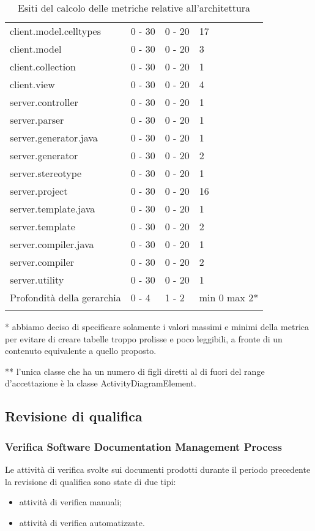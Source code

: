 \begin{longtable}{|p{5.5cm}|p{2.25cm}|p{2.25cm}|p{2.25cm}|}
		client.model.celltypes &0 - 30 &0 - 20 &17\\
		client.model &0 - 30 &0 - 20 &3\\
		client.collection &0 - 30 &0 - 20 &1\\
		client.view &0 - 30 &0 - 20 &4\\
		server.controller &0 - 30 &0 - 20 &1\\
		server.parser &0 - 30 &0 - 20 &1\\
		server.generator.java &0 - 30 &0 - 20 &1\\
		server.generator &0 - 30 &0 - 20 &2\\
		server.stereotype &0 - 30 &0 - 20 &1\\
		server.project &0 - 30 &0 - 20 &16\\
		server.template.java &0 - 30 &0 - 20 &1\\
		server.template &0 - 30 &0 - 20 &2\\
		server.compiler.java &0 - 30 &0 - 20 &1\\
		server.compiler &0 - 30 &0 - 20 &2\\
		server.utility &0 - 30 &0 - 20 &1\\
		\hline
		Profondità della gerarchia &0 - 4 &1 - 2 &min 0 max 2*\\
		\hline
		\caption{Esiti del calcolo delle metriche relative all'architettura}
		\end{longtable}
	* abbiamo deciso di specificare solamente i valori massimi e minimi della metrica per evitare di creare tabelle troppo prolisse e poco leggibili, a fronte di un contenuto equivalente a quello proposto.
	
	** l'unica classe che ha un numero di figli diretti al di fuori del range d'accettazione è la classe ActivityDiagramElement.

\subsection{Revisione di qualifica}
		\subsubsection{Verifica Software Documentation Management Process}
		Le attività di verifica svolte sui documenti prodotti durante il periodo precedente la revisione di qualifica sono state di due tipi:
		\begin{itemize}		
			\item attività di verifica manuali;
			\item attività di verifica automatizzate.
		\end{itemize}
		
